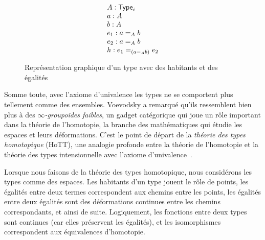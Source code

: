 \begin{figure}[!h]
\begin{minipage}{0.4\textwidth}
  \end{minipage}
  \begin{minipage}{0.4\textwidth}
  \[
    \begin{array}{l}
      A : \varType_i \\
      a : A \\
      b : A \\
      e_1 : \Indeq{A}{a}{b} \\
      e_2 : \Indeq{A}{a}{b} \\
      h : \Indeq{(\Indeq{A}{a}{b})}{e_1}{e_2}
    \end{array}
  \]
  \end{minipage}
  \caption{Représentation graphique d'un type avec des habitants et des égalités}
\end{figure}

Somme toute, avec l'axiome d'univalence les types ne se comportent plus 
tellement comme des ensembles. 
% 
Voevodsky a remarqué qu'ils ressemblent bien plus à des 
\emph{\( \infty \)-groupoïdes faibles}, un gadget catégorique qui joue un rôle 
important dans la théorie de l'homotopie, la branche des mathématiques qui 
étudie les espaces et leurs déformations. 
% 
C'est le point de départ de la \emph{théorie des types homotopique} (HoTT), une 
analogie profonde entre la théorie de l'homotopie et la théorie des types 
intensionnelle avec l'axiome d'univalence~\cite{hottbook}.

Lorsque nous faisons de la théorie des types homotopique, nous considérons les 
types comme des espaces. Les habitants d'un type jouent le rôle de points, 
les égalités entre deux termes correspondent aux chemins entre les points, les 
égalités entre deux égalités sont des déformations continues entre les chemins 
correspondants, et ainsi de suite. 
% 
Logiquement, les fonctions entre deux types sont continues (car elles
préservent les égalités), et les isomorphismes correspondent aux équivalences 
d'homotopie. 

